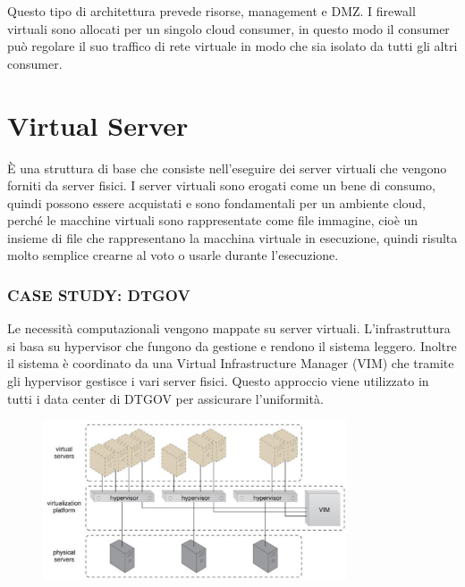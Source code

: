 \vspace{5mm}

Questo tipo di architettura prevede risorse, management e DMZ. I firewall virtuali sono allocati per un singolo cloud consumer, in questo modo il consumer può regolare il suo traffico di rete virtuale in modo che sia isolato da tutti gli altri consumer.

\section{Virtual Server}
È una struttura di base che consiste nell'eseguire dei server virtuali che vengono forniti da server fisici. I server virtuali sono erogati come un bene di consumo, quindi possono essere acquistati e sono fondamentali per un ambiente cloud, perché le macchine virtuali sono rappresentate come file immagine, cioè un insieme di file che rappresentano la macchina virtuale in esecuzione, quindi risulta molto semplice crearne al voto o usarle durante l'esecuzione.

\subsubsection{\textbf{CASE STUDY: DTGOV}}
Le necessità computazionali vengono mappate su server virtuali. L'infrastruttura si basa su hypervisor che fungono da gestione e rendono il sistema leggero. Inoltre il sistema è coordinato da una Virtual Infrastructure Manager (VIM) che tramite gli hypervisor gestisce i vari server fisici. Questo approccio viene utilizzato in tutti i data center di DTGOV per assicurare l'uniformità.

\begin{figure}[htb!]
    \centering
    \includegraphics[width=9cm]{./Images/cap8/8.3.png}
\end{figure}

